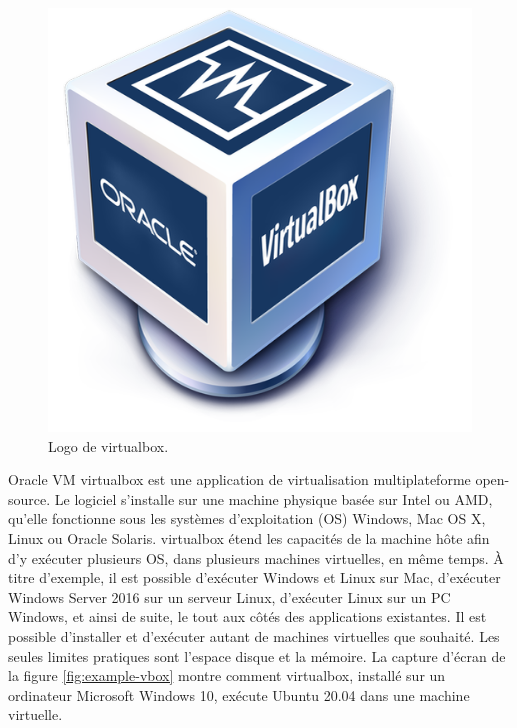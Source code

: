 \documentclass[12pt, french]{report}
\begin{document}
\begin{figure}[h]
\includegraphics[scale=0.2]{assets/img/logo-virtualbox.png}
\centering
\caption{Logo de \gls{virtualbox}.}
\label{fig:logo-adaltas}
\end{figure}

Oracle VM \gls{virtualbox} est une application de virtualisation multiplateforme open-source. Le logiciel s'installe sur une machine physique basée sur Intel ou AMD, qu'elle fonctionne sous les systèmes d'exploitation (OS) Windows, Mac OS X, Linux ou Oracle Solaris. \gls{virtualbox} étend les capacités de la machine hôte afin d'y exécuter plusieurs OS, dans plusieurs machines virtuelles, en même temps. À titre d'exemple, il est possible d'exécuter Windows et Linux sur Mac, d'exécuter Windows Server 2016 sur un serveur Linux, d'exécuter Linux sur un PC Windows, et ainsi de suite, le tout aux côtés des applications existantes. Il est possible d'installer et d'exécuter autant de machines virtuelles que souhaité. Les seules limites pratiques sont l'espace disque et la mémoire. La capture d'écran de la figure \ref{fig:example-vbox} montre comment \gls{virtualbox}, installé sur un ordinateur Microsoft Windows 10, exécute Ubuntu 20.04 dans une machine virtuelle.
\end{document}
